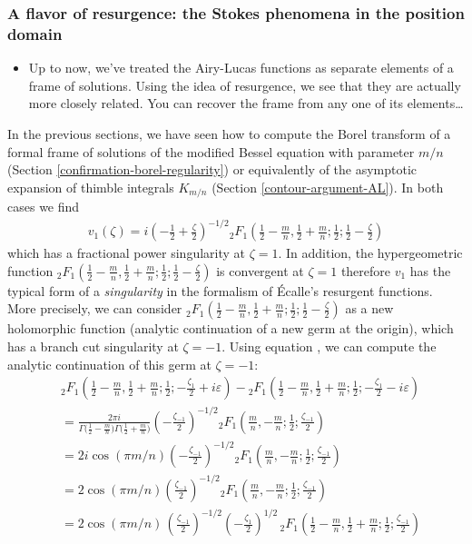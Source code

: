 \documentclass{article}
\theoremstyle{definition}
\theoremstyle{plain}
\newenvironment{brainstorm}{\color{BlueViolet}\begin{itemize}}{\end{itemize}\color{black}}
\newenvironment{draft}{\color{SlateBlue}}{\color{black}}
\begin{document}
\subsubsection{A flavor of resurgence: the Stokes phenomena in the position domain}\label{resurgence-AL}
%
\begin{brainstorm}
\item Up to now, we've treated the Airy-Lucas functions as separate elements of a frame of solutions. Using the idea of resurgence, we see that they are actually more closely related. You can recover the frame from any one of its elements\ldots
\end{brainstorm}
\begin{draft}In the previous sections, we have seen how to compute the Borel transform of a formal frame of solutions of the modified Bessel equation with parameter $m/n$ (Section \ref{confirmation-borel-regularity}) or equivalently of the asymptotic expansion of thimble integrals $K_{m/n}$ (Section \ref{contour-argument-AL}). In both cases we find\end{draft}
\begin{align*}
v_1(\zeta) = i \left(-\frac{1}{2}+\frac{\zeta}{2}\right)^{-1/2} {}_2F_1\left(\frac{1}{2}-\frac{m}{n},\frac{1}{2}+\frac{m}{n};\frac{1}{2};\frac{1}{2}-\frac{\zeta}{2}\right)
\end{align*}
which has a fractional power singularity at $\zeta=1$. In addition, the hypergeometric function ${}_2F_1\left(\frac{1}{2}-\frac{m}{n},\frac{1}{2}+\frac{m}{n};\frac{1}{2};\frac{1}{2}-\frac{\zeta}{2}\right)$ is convergent at $\zeta=1$ therefore $v_1$ has the typical form of a \textit{singularity} in the formalism of \'Ecalle's resurgent functions. More precisely, we can consider ${}_2F_1\left(\frac{1}{2}-\frac{m}{n},\frac{1}{2}+\frac{m}{n};\frac{1}{2};\frac{1}{2}-\frac{\zeta}{2}\right)$ as a new holomorphic function (analytic continuation of a new germ at the origin), which has a branch cut singularity at $\zeta=-1$. Using equation \cite[15.2.3]{dlmf}, we can compute the analytic continuation of this germ at $\zeta=-1$: 
\begin{align*}
&{}_2F_1\left(\frac{1}{2}-\frac{m}{n},\frac{1}{2}+\frac{m}{n};\frac{1}{2};-\frac{\zeta_1}{2}+i\varepsilon\right)-{}_2F_1\left(\frac{1}{2}-\frac{m}{n},\frac{1}{2}+\frac{m}{n};\frac{1}{2};-\frac{\zeta_1}{2}-i\varepsilon\right) \\
&=\frac{2\pi i}{\Gamma\big(\tfrac{1}{2}-\tfrac{m}{n}\big)\Gamma\big(\tfrac{1}{2}+\tfrac{m}{n}\big)} \left(-\frac{\zeta_{-1}}{2}\right)^{-1/2} {}_2F_1\left(\frac{m}{n},-\frac{m}{n};\frac{1}{2};\frac{\zeta_{-1}}{2}\right) \\
&=2 i\cos(\pi m/n) \left(-\frac{\zeta_{-1}}{2}\right)^{-1/2} {}_2F_1\left(\frac{m}{n},-\frac{m}{n};\frac{1}{2};\frac{\zeta_{-1}}{2}\right) \\
&=2\cos(\pi m/n) \left(\frac{\zeta_{-1}}{2}\right)^{-1/2} {}_2F_1\left(\frac{m}{n},-\frac{m}{n};\frac{1}{2};\frac{\zeta_{-1}}{2}\right) \\
&=2\cos(\pi m/n)\, \left(\frac{\zeta_{-1}}{2}\right)^{-1/2} \left(-\frac{\zeta_{1}}{2}\right)^{1/2}\, {}_2F_1\left(\frac{1}{2}-\frac{m}{n},\frac{1}{2}+\frac{m}{n};\frac{1}{2};\frac{\zeta_{-1}}{2}\right)
\end{align*}
\end{document}
